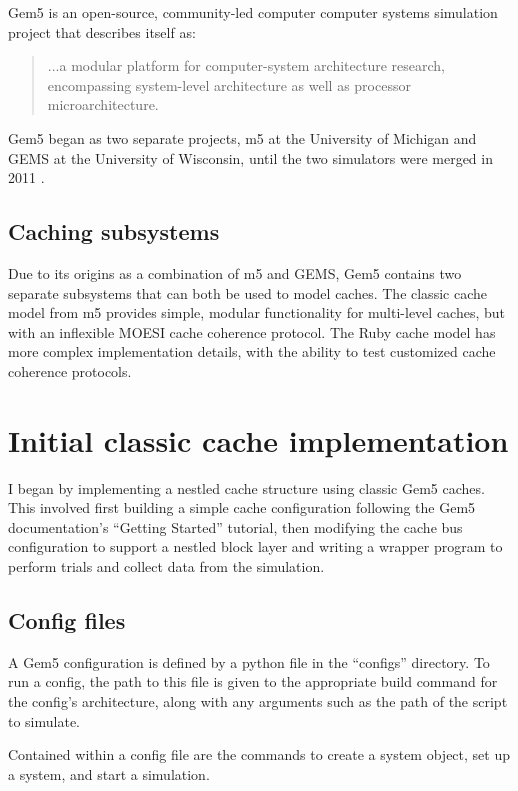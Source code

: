 \documentclass[12pt,twoside]{reedthesis}
\begin{document}
Gem5 is an open-source, community-led computer computer systems simulation project that describes itself as: \begin{quote}
	...a modular platform for computer-system architecture research, encompassing system-level architecture as well as processor microarchitecture. \cite{gem5-about}
\end{quote}

Gem5 began as two separate projects, m5 at the University of Michigan and GEMS at the University of Wisconsin, until the two simulators were merged in 2011 \cite{gem5-about}.

	\subsection*{Caching subsystems}

	Due to its origins as a combination of m5 and GEMS, Gem5 contains two separate subsystems that can both be used to model caches. The classic cache model from m5 provides simple, modular functionality for multi-level caches, but with an inflexible MOESI cache coherence protocol. The Ruby cache model has more complex implementation details, with the ability to test customized cache coherence protocols.

\section{Initial classic cache implementation}

	I began by implementing a nestled cache structure using classic Gem5 caches. This involved first building a simple cache configuration following the Gem5 documentation's ``Getting Started'' tutorial, then modifying the cache bus configuration to support a nestled block layer and writing a wrapper program to perform trials and collect data from the simulation.

	\subsection*{Config files}

	A Gem5 configuration is defined by a python file in the ``configs'' directory. To run a config, the path to this file is given to the appropriate build command for the config's architecture, along with any arguments such as the path of the script to simulate.
	
	Contained within a config file are the commands to create a system object, set up a system, and start a simulation.
\end{document}
